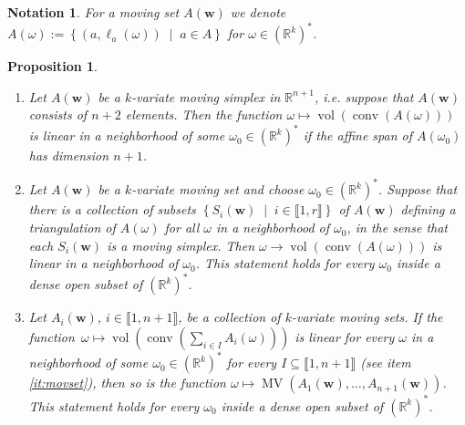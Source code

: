 \documentclass[a4paper]{article}
\newtheorem{proposition}{Proposition}
\newtheorem{notation}{Notation}
\theoremstyle{remark}
\newcommand{\setdes}[2]{\left\{#1\;\middle|\;#2\right\}}
\def\RR{\mathbb{R}}
\newcommand{\irng}[1]{\llbracket #1 \rrbracket}
\DeclareMathOperator{\mv}{MV}
\DeclareMathOperator{\vol}{vol}
\DeclareMathOperator{\Conv}{conv}
\begin{document}
\begin{notation}
  For a moving set $A(\mathbf{w})$ we denote
  $A(\omega) := \setdes{(a, \ell_a(\omega))}{a\in A}$ for $\omega\in (\RR^k)^{*}$.
\end{notation}

\begin{proposition}
  \label{prop:movset}
  \begin{enumerate}
  \item \label{it:movsimplex} Let $A(\mathbf{w})$ be a $k$-variate moving simplex in
    $\RR^{n+1}$, i.e. suppose that $A(\mathbf{w})$ consists of $n + 2$
    elements. Then the function $\omega \mapsto \vol(\Conv(A(\omega)))$ is linear in a neighborhood
    of some $\omega_0\in (\RR^k)^{*}$ if the affine span of $A(\omega_0)$ has dimension $n + 1$.
  \item \label{it:movset} Let $A(\mathbf{w})$ be a $k$-variate moving
    set and choose $\omega_0\in (\RR^k)^{*}$.  Suppose that there is a
    collection of subsets $\setdes{S_i(\mathbf{w})}{i\in \irng{1,r}}$ of
    $A(\mathbf{w})$ defining a triangulation of $A(\omega)$ for all
    $\omega$ in a neighborhood of $\omega_0$, in the sense that each
    $S_i(\mathbf{w})$ is a moving simplex. Then
    $\omega \rightarrow \vol(\Conv(A(\omega)))$ is linear in a neighborhood of
    $\omega_0$.  This statement holds for every $\omega_0$ inside a dense open
    subset of $(\RR^k)^{*}$.
  \item \label{it:movsetmv} Let $A_i(\mathbf{w})$,
    $i \in \irng{1,n+1}$, be a collection of $k$-variate moving sets. If
    the
    function~$\omega \mapsto \vol(\Conv(\sum_{i\in I}A_{i}(\omega)))$ is linear for every
    $\omega$ in a neighborhood of some $\omega_0\in (\RR^k)^{*}$ for every
    $I\subseteq \irng{1,n+1}$ (see item \ref{it:movset}), then so is the
    function
    $\omega \mapsto \mv(A_1(\mathbf{w}),\ldots, A_{n+1}(\mathbf{w}))$. This statement
    holds for every $\omega_0$ inside a dense open subset of $(\RR^k)^{*}$.
  \end{enumerate}
\end{proposition}
\end{document}
